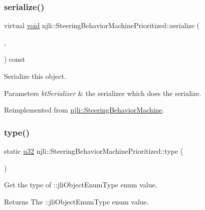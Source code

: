 \subsubsection{\texorpdfstring{serialize()}{serialize()}}
{\footnotesize\ttfamily virtual \mbox{\hyperlink{_thread_8h_af1e856da2e658414cb2456cb6f7ebc66}{void}} njli\+::\+Steering\+Behavior\+Machine\+Prioritized\+::serialize (\begin{DoxyParamCaption}\item[{\mbox{\hyperlink{_thread_8h_af1e856da2e658414cb2456cb6f7ebc66}{void}} $\ast$}]{,  }\item[{bt\+Serializer $\ast$}]{ }\end{DoxyParamCaption}) const\hspace{0.3cm}{\ttfamily [virtual]}}

Serialize this object.


\begin{DoxyParams}{Parameters}
{\em bt\+Serializer} & the serializer which does the serialize. \\
\hline
\end{DoxyParams}


Reimplemented from \mbox{\hyperlink{classnjli_1_1_steering_behavior_machine_a1fbec43b76f0612ed5b0d2492bb4b6df}{njli\+::\+Steering\+Behavior\+Machine}}.

\mbox{\label{classnjli_1_1_steering_behavior_machine_prioritized_a3ca6a1a70276d06bb904a80bfae2110e}} 
\subsubsection{\texorpdfstring{type()}{type()}}
{\footnotesize\ttfamily static \mbox{\hyperlink{_util_8h_a10e94b422ef0c20dcdec20d31a1f5049}{u32}} njli\+::\+Steering\+Behavior\+Machine\+Prioritized\+::type (\begin{DoxyParamCaption}{ }\end{DoxyParamCaption})\hspace{0.3cm}{\ttfamily [static]}}

Get the type of \+::jli\+Object\+Enum\+Type enum value.

\begin{DoxyReturn}{Returns}
The \+::jli\+Object\+Enum\+Type enum value. 
\end{DoxyReturn}


